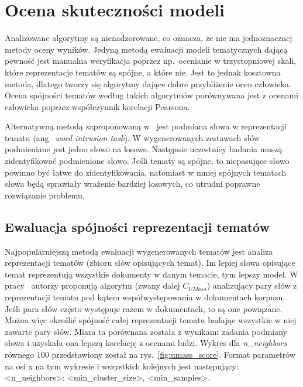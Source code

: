 
\chapter{Ocena skuteczności modeli}
	Analizowane algorytmy są nienadzorowane, co oznacza, że nie ma jednoznacznej metody oceny wyników.
	Jedyną metodą ewaluacji modeli tematycznych dającą pewność jest manualna weryfikacja poprzez np.\ ocenianie w trzystopniowej skali,
		które reprezentacje tematów są spójne, a które nie.
	Jest to jednak kosztowna metoda, dlatego tworzy się algorytmy dające dobre przybliżenie ocen człowieka.
	Ocena spójności tematów według takich algorytmów porównywana jest z ocenami człowieka poprzez współczynnik korelacji Pearsona.

	Alternatywną metodą zaproponowaną w~\cite{Word_intrusion} jest podmiana słowa w reprezentacji tematu (ang.\ \emph{word intrusion task}).
	W wygenerowanych zestawach słów podmieniane jest jedno słowo na losowe.
	Następnie uczestnicy badania muszą zidentyfikować podmienione słowo.
	Jeśli tematy są spójne, to niepasujące słowo powinno być łatwe do zidentyfikowania,
		natomiast w mniej spójnych tematach słowa będą sprawiały wrażenie bardziej losowych, co utrudni poprawne rozwiązanie problemu.

\section{Ewaluacja spójności reprezentacji tematów}\label{sec:coherence_scores}
	Najpopularniejszą metodą ewaluacji wygenerowanych tematów jest analiza reprezentacji tematów (zbioru słów opisujących temat).
	Im lepiej słowa opisujące temat reprezentują wszystkie dokumenty w danym temacie, tym lepszy model.
	W pracy~\cite{U_MASS} autorzy proponują algorytm (zwany dalej \(C_{UMass}\))
		analizujący pary słów z reprezentacji tematu pod kątem współwystępowania w dokumentach korpusu.
	Jeśli para słów często występuje razem w dokumentach, to są one powiązane.
	Można więc określić spójność całej reprezentacji tematu badając wszystkie w niej zawarte pary słów.
	Miara ta porównana została z wynikami zadania podmiany słowa i uzyskała ona lepszą korelację z ocenami ludzi.
	Wykres dla \emph{n\_neighbors} równego 100 przedstawiony został na rys.~\ref{fig:umass_score}.
	Format parametrów na osi x na tym wykresie i wszystkich kolejnych jest następujący: <n\_neighbors>: <min\_cluster\_size>, <min\_samples>.

